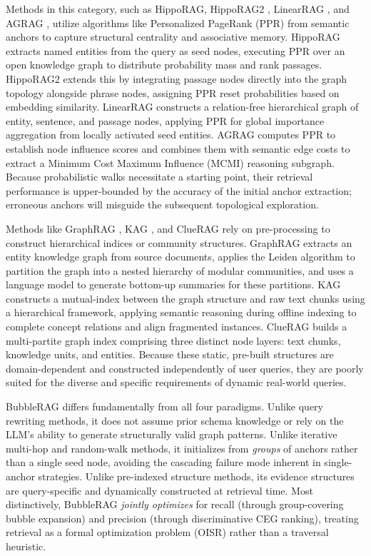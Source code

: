  Methods in this category, such as HippoRAG, HippoRAG2 \cite{2024-hipporag, 2025-ragmemory}, LinearRAG \cite{2025-linearrag}, and AGRAG \cite{2025-agrag}, utilize algorithms like Personalized PageRank (PPR) \cite{1999-pagerank} from semantic anchors to capture structural centrality and associative memory. HippoRAG extracts named entities from the query as seed nodes, executing PPR over an open knowledge graph to distribute probability mass and rank passages. HippoRAG2 extends this by integrating passage nodes directly into the graph topology alongside phrase nodes, assigning PPR reset probabilities based on embedding similarity. LinearRAG constructs a relation-free hierarchical graph of entity, sentence, and passage nodes, applying PPR for global importance aggregation from locally activated seed entities. AGRAG computes PPR to establish node influence scores and combines them with semantic edge costs to extract a Minimum Cost Maximum Influence (MCMI) reasoning subgraph. Because probabilistic walks necessitate a starting point, their retrieval performance is upper-bounded by the accuracy of the initial anchor extraction; erroneous anchors will misguide the subsequent topological exploration.

 Methods like GraphRAG \cite{2024-edge2024local}, KAG \cite{2024-kag}, and ClueRAG \cite{2025-cluerag} rely on pre-processing to construct hierarchical indices or community structures. GraphRAG extracts an entity knowledge graph from source documents, applies the Leiden algorithm to partition the graph into a nested hierarchy of modular communities, and uses a language model to generate bottom-up summaries for these partitions. KAG constructs a mutual-index between the graph structure and raw text chunks using a hierarchical framework, applying semantic reasoning during offline indexing to complete concept relations and align fragmented instances. ClueRAG builds a multi-partite graph index comprising three distinct node layers: text chunks, knowledge units, and entities. Because these static, pre-built structures are domain-dependent and constructed independently of user queries, they are poorly suited for the diverse and specific requirements of dynamic real-world queries.

BubbleRAG differs fundamentally from all four paradigms. Unlike query rewriting methods, it does not assume prior schema knowledge or rely on the LLM's ability to generate structurally valid graph patterns. Unlike iterative multi-hop and random-walk methods, it initializes from \emph{groups} of anchors rather than a single seed node, avoiding the cascading failure mode inherent in single-anchor strategies. Unlike pre-indexed structure methods, its evidence structures are query-specific and dynamically constructed at retrieval time. Most distinctively, BubbleRAG \emph{jointly optimizes} for recall (through group-covering bubble expansion) and precision (through discriminative CEG ranking), treating retrieval as a formal optimization problem (OISR) rather than a traversal heuristic.



